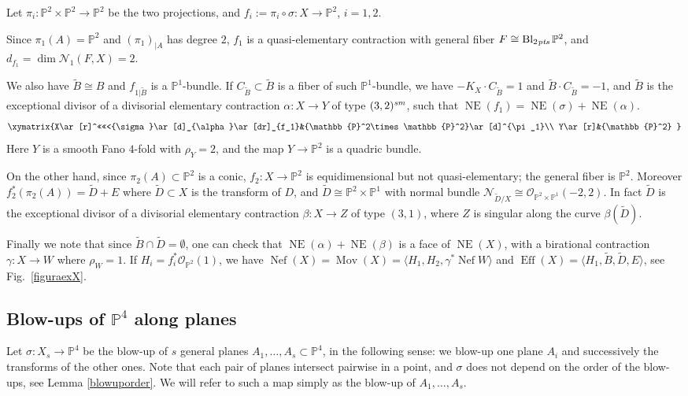 \documentclass[a4paper,12pt]{amsart}
\theoremstyle{definition}
\numberwithin{figure}{section}
\numberwithin{table}{section}
\newcommand{\w}{\widetilde}
\newcommand{\ma}{\mathcal}
\newcommand{\ol}{\mathcal{O}}
\newcommand{\pr}{\mathbb{P}}
\newcommand{\N}{\mathcal{N}_1}
\newcommand{\NE}{\operatorname{NE}}
\newcommand{\Eff}{\operatorname{Eff}}
\newcommand{\Nef}{\operatorname{Nef}}
\newcommand{\Mov}{\operatorname{Mov}}
\newcommand{\Bl}{\operatorname{Bl}}
\newcommand{\sm}{\text{\it sm}}
\newcommand{\pts}{\text{\it pts}}
\begin{document}
Let $\pi_i\colon \pr^2\times\pr^2\to\pr^2$ be the two projections, and $f_i:=\pi_i\circ\sigma\colon X\to\pr^2$, $i=1,2$.

Since $\pi_1(A)=\pr^2$ and $(\pi_1)_{|A}$ has degree $2$, $f_1$ is a quasi-elementary contraction with general fiber $F\cong\Bl_{2\mskip1mu\pts}\pr^2$, and $d_{f_1}=\dim\N(F,X)=2$.

We also have $\w{B}\cong B$ and $f_{1|\w{B}}$ is a $\pr^1$-bundle. If $C_{\w{B}}\subset\w{B}$ is a fiber of such $\pr^1$-bundle, we have $-K_X\cdot C_{\w{B}}=1$ and $\w{B}\cdot  C_{\w{B}}=-1$, and $\w{B}$ is the exceptional divisor of a divisorial elementary contraction $\alpha\colon X\to Y$ of type $(3,2)^{\sm}$, such that $\NE(f_1)=\NE(\sigma)+\NE(\alpha)$.
$$\xymatrix{X\ar[r]^<<<<<{\sigma}\ar[d]_{\alpha}\ar[dr]_{f_1}&{\pr^2\times\pr^2}\ar[d]^{\pi_1}\\
Y\ar[r]&{\pr^2}
  }$$
  Here $Y$ is a smooth Fano $4$-fold with $\rho_Y=2$, and the map $Y\to\pr^2$ is a quadric bundle.
  
  On the other hand, since $\pi_2(A)\subset\pr^2$ is a conic, $f_2\colon X\to\pr^2$ is equidimensional but not quasi-elementary; the general fiber is $\pr^2$. Moreover $f_2^*(\pi_2(A))=\w{D}+E$ where $\w{D}\subset X$ is the transform of $D$, and $\w{D}\cong\pr^2\times\pr^1$ with normal bundle $\ma{N}_{\w{D}/X}\cong\ol_{\pr^2\times\pr^1}(-2,2)$. In fact $\w{D}$ is the exceptional divisor of a divisorial elementary contraction $\beta\colon X\to Z$ of type $(3,1)$, where $Z$ is singular along the curve $\beta(\w{D})$.

Finally we note that since $\w{B}\cap\w{D}=\emptyset$, one can check that $\NE(\alpha)+\NE(\beta)$ is a face of $\NE(X)$, with a birational contraction $\gamma\colon X\to W$ where $\rho_W=1$.
 If $H_i=f_i^*\ol_{\pr^2}(1)$, we have $\Nef(X)=\Mov(X)=\langle H_1, H_2, \gamma^*\Nef W\rangle$ and $\Eff(X)=\langle H_1, \w{B}, \w{D}, E\rangle$, see Fig.~\ref{figuraexX}.
\subsection{Blow-ups of $\pr^4$ along planes}
\noindent Let $\sigma\colon X_s\to\pr^4$ be the blow-up of $s$ general planes $A_1,\dotsc,A_s\subset\pr^4$, in the following sense: we blow-up one plane $A_i$ and successively the transforms of the other ones.
 Note that each pair of planes intersect pairwise in a point, and $\sigma$ does not depend on the order of the blow-ups,  see Lemma \ref{blowuporder}. We will refer to such a map simply as the blow-up of $A_1,\dotsc,A_s$.
\end{document}
